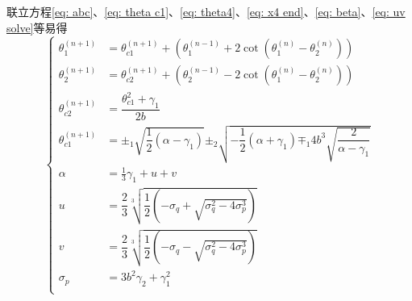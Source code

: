 \documentclass[UTF8]{ctexart}
\begin{document}
				联立方程\ref{eq: abc}、\ref{eq: theta c1}、\ref{eq: theta4}、\ref{eq: x4 end}、\ref{eq: beta}、\ref{eq: uv solve}等易得
				\begin{equation}
					\begin{cases}
						\theta_{1}^{(n + 1)}  & = \theta_{c1}^{(n + 1)} + \left(\theta_{1}^{(n-1)} + 2 \cot(\theta_{1}^{(n)} - \theta_2^{(n)})\right)                                                                                                                                                           \\
						\theta_{2}^{(n + 1)}  & = \theta_{c2}^{(n + 1)} + \left(\theta_{2}^{(n-1)} - 2 \cot(\theta_{1}^{(n)} - \theta_2^{(n)})\right)                                                                                                                                                           \\
						\theta_{c2}^{(n + 1)} & = \dfrac{\theta_{c1}^{2} + \gamma_1}{2 b}                                                                                                                                                                                                                       \\
						\theta_{c1}^{(n + 1)} & = \pm_{1} \sqrt{\dfrac{1}{2} (\alpha - \gamma_{1})} \pm_{2} \sqrt{- \dfrac{1}{2} (\alpha + \gamma_{1}) \mp_{1} 4 b^{3}\sqrt{\dfrac{2}{\alpha - \gamma_{1}}}}                                                                                                    \\
						\alpha                & = \frac{1}{3} \gamma_{1} + u + v                                                                                                                                                                                                                                \\
						u                     & = \dfrac{2}{3} \sqrt[3]{\dfrac{1}{2}\left(- \sigma_q + \sqrt{\sigma_q^2 - 4 \sigma_p^3}\right)}                                                                                                                                                                 \\
						v                     & = \dfrac{2}{3} \sqrt[3]{\dfrac{1}{2}\left(- \sigma_q - \sqrt{\sigma_q^2 - 4 \sigma_p^3}\right)}                                                                                                                                                                 \\
						\sigma_p              & = 3 b^{2} \gamma_{2} + \gamma_{1}^{2}                                                                                                                                                                                                                           \\

\end{cases}
\end{equation}
\end{document}
